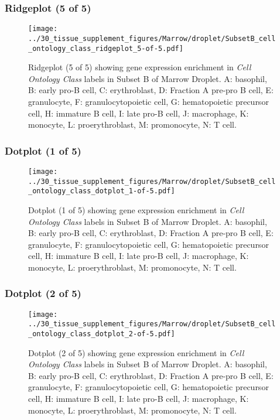 \clearpage

\subsubsection{Ridgeplot (5 of 5)}
\begin{figure}[h]
\centering
\texttt{[image: ../30\_tissue\_supplement\_figures/Marrow/droplet/SubsetB\_cell\_ontology\_class\_ridgeplot\_5-of-5.pdf]}

\caption{ Ridgeplot (5 of 5)  showing gene expression enrichment in \emph{Cell Ontology Class} labels in Subset B of Marrow Droplet. A: basophil, B: early pro-B cell, C: erythroblast, D: Fraction A pre-pro B cell, E: granulocyte, F: granulocytopoietic cell, G: hematopoietic precursor cell, H: immature B cell, I: late pro-B cell, J: macrophage, K: monocyte, L: proerythroblast, M: promonocyte, N: T cell.}
\end{figure}


\clearpage

\subsubsection{Dotplot (1 of 5)}
\begin{figure}[h]
\centering
\texttt{[image: ../30\_tissue\_supplement\_figures/Marrow/droplet/SubsetB\_cell\_ontology\_class\_dotplot\_1-of-5.pdf]}

\caption{ Dotplot (1 of 5)  showing gene expression enrichment in \emph{Cell Ontology Class} labels in Subset B of Marrow Droplet. A: basophil, B: early pro-B cell, C: erythroblast, D: Fraction A pre-pro B cell, E: granulocyte, F: granulocytopoietic cell, G: hematopoietic precursor cell, H: immature B cell, I: late pro-B cell, J: macrophage, K: monocyte, L: proerythroblast, M: promonocyte, N: T cell.}
\end{figure}


\clearpage

\subsubsection{Dotplot (2 of 5)}
\begin{figure}[h]
\centering
\texttt{[image: ../30\_tissue\_supplement\_figures/Marrow/droplet/SubsetB\_cell\_ontology\_class\_dotplot\_2-of-5.pdf]}

\caption{ Dotplot (2 of 5)  showing gene expression enrichment in \emph{Cell Ontology Class} labels in Subset B of Marrow Droplet. A: basophil, B: early pro-B cell, C: erythroblast, D: Fraction A pre-pro B cell, E: granulocyte, F: granulocytopoietic cell, G: hematopoietic precursor cell, H: immature B cell, I: late pro-B cell, J: macrophage, K: monocyte, L: proerythroblast, M: promonocyte, N: T cell.}
\end{figure}


